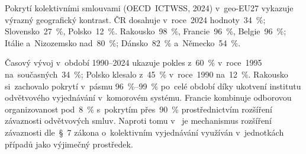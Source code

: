 Pokrytí kolektivními smlouvami (\acs{OECD}~\acs{ICTWSS}, 2024) v~\acs{geo-EU27} vykazuje výrazný geografický kontrast. \Ac{ČR} dosahuje v~roce~2024 hodnoty~\SI{34}{\percent}; Slovensko~\SI{27}{\percent}, Polsko~\SI{12}{\percent}. Rakousko~\SI{98}{\percent}, Francie~\SI{96}{\percent}, Belgie~\SI{96}{\percent}; Itálie a~Nizozemsko nad~\SI{80}{\percent}; Dánsko~\SI{82}{\percent} a~Německo~\SI{54}{\percent}.

Časový vývoj v~období 1990--2024 ukazuje pokles  z~\SI{60}{\percent} v~roce~1995 na~současných~\SI{34}{\percent}; Polsko klesalo z~\SI{45}{\percent} v~roce~1990 na~\SI{12}{\percent}. Rakousko si~zachovalo pokrytí v~pásmu \SIrange{96}{99}{\percent} po~celé období díky ukotvení institutu odvětvového vyjednávání v~komorovém systému. Francie kombinuje odborovou organizovanost pod~\SI{8}{\percent} s~pokrytím přes~\SI{90}{\percent} prostřednictvím rozšíření závaznosti odvětvových smluv. Naproti tomu v~ je mechanismus rozšíření závaznosti  dle~\S~7 zákona o~kolektivním vyjednávání využíván v~jednotkách případů jako výjimečný prostředek.~\cite{zakon_kv_1991}


